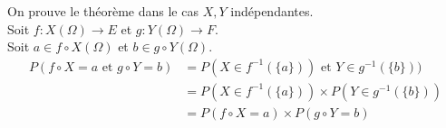 \documentclass[../main.tex]{subfiles}
\begin{document}
\noindent On prouve le théorème dans le cas $X, Y$ indépendantes. \\
Soit $f:X(\Omega)\to E$ et $g:Y(\Omega)\to F$. \\
Soit $a\in f \circ X(\Omega)$ et $b\in g \circ Y(\Omega)$. 
\begin{align*}
    P(f\circ X = a \text{ et } g\circ Y = b) &= P(X\in f^{-1}(\{a\})) \text{ et } Y\in g^{-1}(\{b\})) \\
    &= P(X\in f^{-1}(\{a\})) \times P(Y\in g^{-1}(\{b\})) \\
    &= P(f\circ X = a) \times P(g\circ Y = b)
\end{align*}
\end{document}
